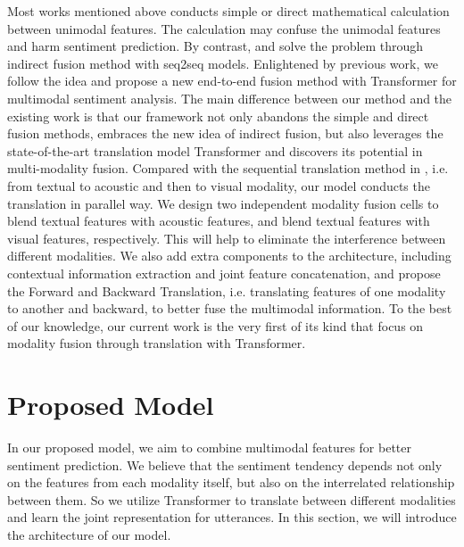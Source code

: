 \documentclass[sigconf]{acmart}
\begin{document}
	Most works mentioned above conducts simple or direct mathematical calculation between unimodal features. The calculation may confuse the unimodal features and harm sentiment prediction. By contrast, \citet{pham2018seq2seq2sentiment} and \citet{pham2018found} solve the problem through indirect fusion method with seq2seq models. Enlightened by previous work, we follow the idea and propose a new end-to-end fusion method with Transformer for multimodal sentiment analysis. The main difference between our method and the existing work is that our framework not only abandons the simple and direct fusion methods, embraces the new idea of indirect fusion, but also leverages the state-of-the-art translation model Transformer and discovers its potential in multi-modality fusion. Compared with the sequential translation method in \citet{pham2018seq2seq2sentiment,pham2018found}, i.e. from textual to acoustic and then to visual modality, our model conducts the translation in parallel way. We design two independent modality fusion cells to blend textual features with acoustic features, and blend textual features with visual features, respectively.  This will help to eliminate the interference between different modalities. We also add extra components to the architecture, including contextual information extraction and joint feature concatenation, and propose the Forward and Backward Translation, i.e. translating features of one modality to another and backward, to better fuse the multimodal information. To the best of our knowledge, our current work is the very first of its kind that focus on modality fusion through translation with Transformer.
	
	\section{Proposed Model}
	In our proposed model, we aim to combine multimodal features for better sentiment prediction. We believe that the sentiment tendency depends not only on the features from each modality itself, but also on the interrelated relationship between them. So we utilize Transformer to translate between different modalities and learn the joint representation for utterances. In this section, we will introduce the architecture of our model.
	
\end{document}
